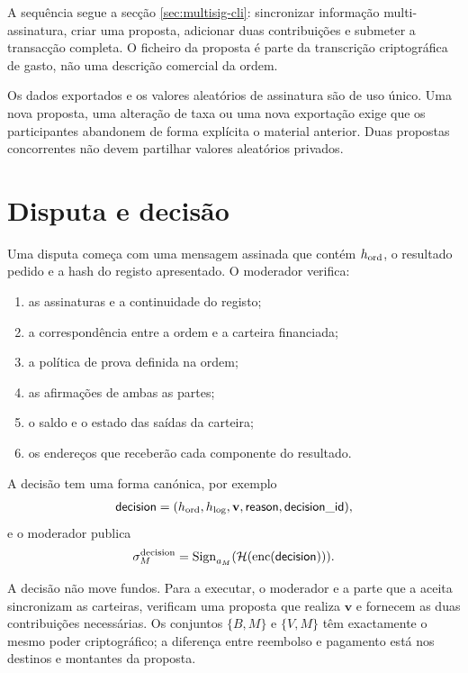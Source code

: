 A sequência segue a secção \ref{sec:multisig-cli}: sincronizar
informação multi-assinatura, criar uma proposta, adicionar duas contribuições
e submeter a transacção completa. O ficheiro da proposta é parte da
transcrição criptográfica de gasto, não uma descrição comercial da ordem.

Os dados exportados e os valores aleatórios de assinatura são de uso único.
Uma nova proposta, uma alteração de taxa ou uma nova exportação exige que os
participantes abandonem de forma explícita o material anterior. Duas propostas
concorrentes não devem partilhar valores aleatórios privados.

\section{Disputa e decisão}
\label{sec:escrow-dispute}

Uma disputa começa com uma mensagem assinada que contém \(h_{\rm ord}\), o
resultado pedido e a hash do registo apresentado. O moderador verifica:

\begin{enumerate}
 \item as assinaturas e a continuidade do registo;
 \item a correspondência entre a ordem e a carteira financiada;
 \item a política de prova definida na ordem;
 \item as afirmações de ambas as partes;
 \item o saldo e o estado das saídas da carteira;
 \item os endereços que receberão cada componente do resultado.
\end{enumerate}

A decisão tem uma forma canónica, por exemplo
\begin{align}
 \mathsf{decision}=
 (h_{\rm ord},h_{\rm log},\mathbf v,\mathsf{reason},
 \mathsf{decision\_id}),
 \label{eq:escrow-decision}
\end{align}
e o moderador publica
\begin{align}
 \sigma_M^{\rm decision}
 =\operatorname{Sign}_{a_M}(
 \mathcal H(\operatorname{enc}(\mathsf{decision}))).
 \label{eq:escrow-decision-signature}
\end{align}

A decisão não move fundos. Para a executar, o moderador e a parte que a aceita
sincronizam as carteiras, verificam uma proposta que realiza
\(\mathbf v\) e fornecem as duas contribuições necessárias. Os conjuntos
\(\{B,M\}\) e \(\{V,M\}\) têm exactamente o mesmo poder criptográfico; a
diferença entre reembolso e pagamento está nos destinos e montantes da
proposta.

